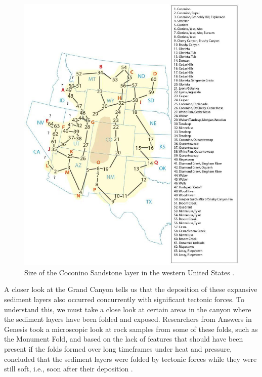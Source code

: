 \documentclass[10pt,twocolumn,letterpaper]{article}
\begin{document}
\begin{figure}[t]
\begin{center}
   \includegraphics[width=1\linewidth]{coconino.jpg}
\end{center}
   \caption{Size of the Coconino Sandstone layer in the western United States \cite{21}.}
\label{fig:3}
\label{fig:onecol}
\end{figure}

A closer look at the Grand Canyon tells us that the deposition of these expansive sediment layers also occurred concurrently with significant tectonic forces. To understand this, we must take a close look at certain areas in the canyon where the sediment layers have been folded and exposed. Researchers from Answers in Genesis \cite{42} took a microscopic look at rock samples from some of these folds, such as the Monument Fold, and based on the lack of features that should have been present if the folds formed over long timeframes under heat and pressure, concluded that the sediment layers were folded by tectonic forces while they were still soft, i.e., soon after their deposition \cite{43}.
\end{document}
